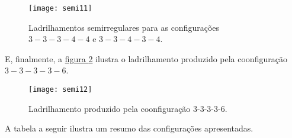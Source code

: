 \begin{figure}[H]
\centering
\texttt{[image: semi11]}
\caption{Ladrilhamentos semirregulares para as configurações  $3-3-3-4-4$ e $3-3-4-3-4$.}
\label{semi11}
\end{figure}

 

E, finalmente, a \hyperref[semi12]{figura \ref{semi12}} ilustra o ladrilhamento produzido pela coonfiguração $3-3-3-3-6$.


\begin{figure}[H]
\centering
\texttt{[image: semi12]}
\caption{Ladrilhamento produzido pela coonfiguração 3-3-3-3-6.}
\label{semi12}
\end{figure}


\clearpage
A tabela a seguir ilustra um resumo das configurações apresentadas.


